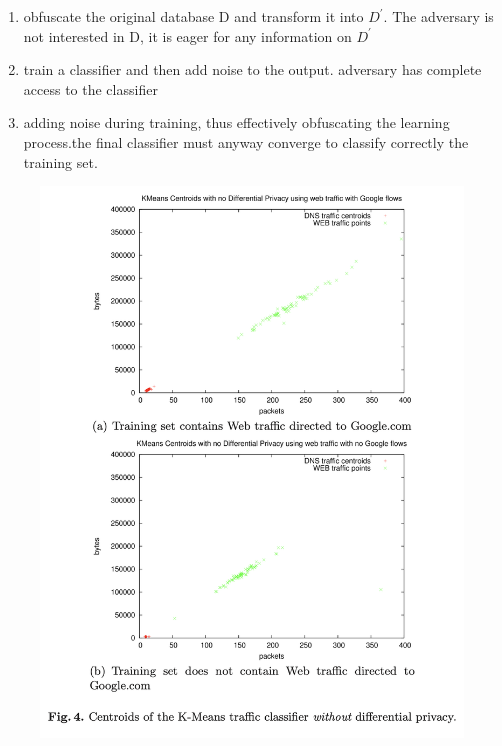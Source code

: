 \documentclass[11pt]{article}
\numberwithin{equation}{section}
\begin{document}
\begin{enumerate}
    \item obfuscate the original database D and transform it into $D^{\prime}$. {\color{blue}The adversary is not interested in D, it is eager for any information on $D^{\prime}$}
    \item train a classifier and then add noise to the output. {\color{blue}adversary has complete access to the classifier}
    \item adding noise during training, thus effectively obfuscating the learning process.{\color{blue}the final classifier must anyway converge to classify correctly the training set.}
\end{enumerate}


\begin{figure}[H]
    \centering
    \includegraphics[width = 15cm]{figures/google_non_diff.png}
    \label{fig:my_label}
\end{figure}
\end{document}
